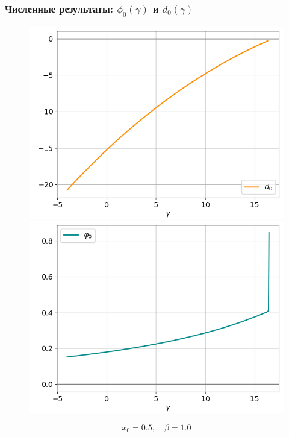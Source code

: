\documentclass[fullscreen=true, unicode, bookmarks=false]{beamer}
\begin{document}
\begin{frame}
\frametitle{ Численные результаты: $ \phi_0(\gamma) $ и $ d_0(\gamma) $ }

\begin{figure} 
\begin{minipage}[h]{0.49\linewidth}
\begin{center}
\includegraphics[scale=0.35]{oscillating_d0_x0=0,5,beta=1,0.png}
\end{center}
\end{minipage} 
\hfill
\begin{minipage}[h]{0.49\linewidth}
\begin{center}
\includegraphics[scale=0.35]{oscillating_phi0_x0=0,5,beta=1,0.png}
\end{center}
\end{minipage} 
\end{figure}

$$ x_0 = 0.5, \quad \beta=1.0 $$

\end{frame}
\end{document}
